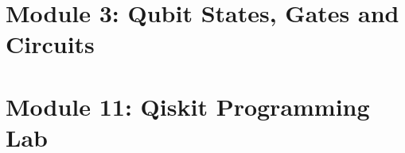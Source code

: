 
\section[Gates]{Module 3: Qubit States, Gates and Circuits}


\section[Qiskit]{Module 11: Qiskit Programming Lab}

